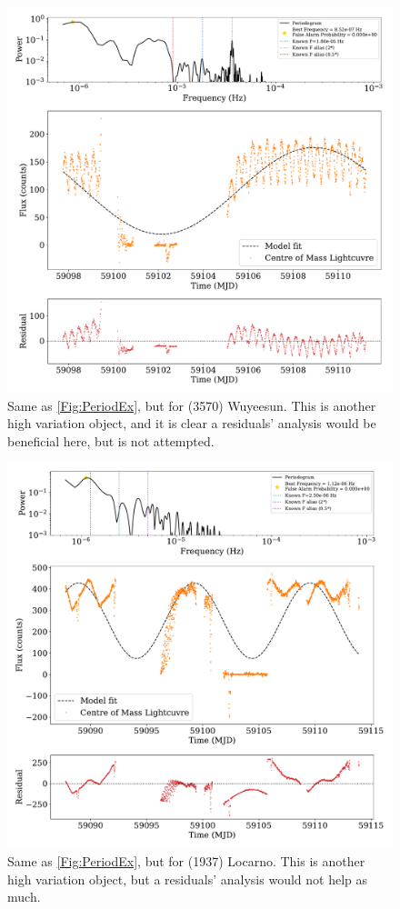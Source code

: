 \documentclass{UCreport}
\begin{document}
\begin{figure}
  \centering
  \includegraphics[width = \textwidth]{Figures/PeriodogramWuyeesunResid.pdf}
  \caption[(3570) Wuyeesun Periodogram]{Same as \autoref{Fig:PeriodEx}, but for (3570) Wuyeesun.
  This is another high variation object, and it is clear a residuals' analysis would be beneficial here, but is not attempted.}
  \label{ApFig:Wuyeesun}
\end{figure}


\begin{figure}
  \centering
  \includegraphics[width = \textwidth]{Figures/PeriodogramLocarnoResid.pdf}
  \caption[(1937) Locarno Periodogram]{Same as \autoref{Fig:PeriodEx}, but for (1937) Locarno.
  This is another high variation object, but a residuals' analysis would not help as much.}
  \label{ApFig:Locarno}
\end{figure}
\end{document}
